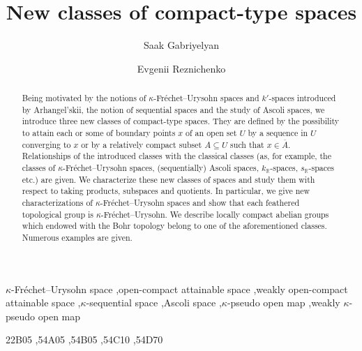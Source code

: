 \documentclass[preprint,11pt]{elsarticle}
\numberwithin{equation}{section}
\numberwithin{theorem}{section}
\newcommand{\IR}{\mathbb{R}}
\begin{document}
\begin{frontmatter}

\title{New classes of compact-type spaces}


\author{Saak Gabriyelyan}%
\address{Department of Mathematics, Ben-Gurion University of the Negev, Beer-Sheva, P.O. 653, Israel}

\author{Evgenii Reznichenko}%
\address{Department of Mathematics, Lomonosov Mosow State University, Moscow, Russia}


\begin{abstract}
Being motivated by the notions of $\kappa$-Fr\'{e}chet--Urysohn spaces and $k'$-spaces introduced by Arhangel'skii, the notion of sequential spaces and the study of Ascoli spaces, we introduce three new classes of compact-type spaces. They are defined by the possibility to attain each or some of boundary points $x$ of an open set $U$ by a sequence in $U$ converging to $x$ or by a relatively compact subset $A\subseteq U$ such that $x\in \overline{A}$. Relationships of the introduced classes with the classical classes (as, for example, the classes of $\kappa$-Fr\'{e}chet--Urysohn spaces, (sequentially) Ascoli spaces, $k_\IR$-spaces, $s_\IR$-spaces etc.)  are given. We characterize these new classes of spaces and study them with respect to taking products,  subspaces and quotients. In particular, we give new characterizations of $\kappa$-Fr\'{e}chet--Urysohn spaces and show that each feathered topological group is $\kappa$-Fr\'{e}chet--Urysohn. We describe locally compact abelian groups which endowed with the Bohr topology  belong to one of the aforementioned classes. Numerous examples are given.
\end{abstract}

\begin{keyword}
$\kappa$-Fr\'{e}chet--Urysohn space \sep open-compact attainable  space  \sep weakly open-compact attainable  space \sep $\kappa$-sequential  space  \sep Ascoli space \sep $\kappa$-pseudo open map \sep weakly $\kappa$-pseudo open map


\MSC[2020] 22B05 \sep 54A05 \sep  54B05 \sep   54C10 \sep 54D70


\end{keyword}

\end{frontmatter}
\end{document}
